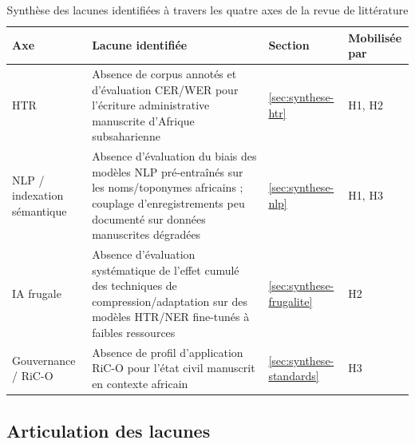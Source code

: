 \begin{table}[H]
    \centering
    \small
    \caption{Synthèse des lacunes identifiées à travers les quatre axes de la revue de littérature}
    \label{tab:synthese-lacunes}
    \begin{tabularx}{\textwidth}{
            >{\raggedright\arraybackslash\hsize=0.85\hsize}X
            >{\raggedright\arraybackslash\hsize=1.85\hsize}X
            >{\raggedright\arraybackslash\hsize=0.6\hsize}X
            >{\raggedright\arraybackslash\hsize=0.7\hsize}X
        }
        \toprule
        \textbf{Axe}                & \textbf{Lacune identifiée}                                                                                                                                                & \textbf{Section}             & \textbf{Mobilisée par} \\
        \midrule
        HTR                         & Absence de corpus annotés et d'évaluation CER/WER pour l'écriture administrative manuscrite d'Afrique subsaharienne                                                       & \ref{sec:synthese-htr}       & H1, H2                 \\
        \midrule
        NLP / indexation sémantique & Absence d'évaluation du biais des modèles NLP pré-entraînés sur les noms/toponymes africains ; couplage d'enregistrements peu documenté sur données manuscrites dégradées & \ref{sec:synthese-nlp}       & H1, H3                 \\
        \midrule
        IA frugale                  & Absence d'évaluation systématique de l'effet cumulé des techniques de compression/adaptation sur des modèles HTR/NER fine-tunés à faibles ressources                      & \ref{sec:synthese-frugalite} & H2                     \\
        \midrule
        Gouvernance / RiC-O         & Absence de profil d'application RiC-O pour l'état civil manuscrit en contexte africain                                                                                    & \ref{sec:synthese-standards} & H3                     \\
        \bottomrule
    \end{tabularx}
\end{table}

\subsection{Articulation des lacunes}
\label{sec:articulation-lacunes}

